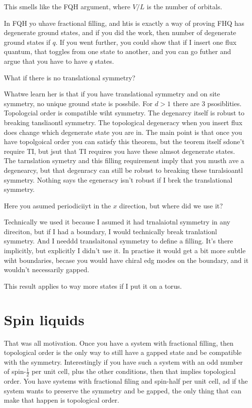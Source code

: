 \begin{question}
    This smells like the FQH argument,
    where $V/L$ is the number of orbitals.
\end{question}
In FQH yo uhave fractional filling,
and htis is exactly a way of proving FHQ has degenerate ground states,
and if you did the work,
then number of degenerate ground states if $q$.
If you went further,
you could show that if I insert one flux quantum,
that toggles from one state to another,
and you can go futher and argue that you have to have $q$ states.

\begin{question}
    What if there is no translational symmetry?
\end{question}
Whatwe learn her is that if you have translational symmetry and on site
symmetry,
no unique ground state is possbile.
For $d>1$ there are 3 psosiblities.
Topologcial order is compatible wiht symmetry.
The degenarcy itself is robust to breaking tansliaontl symmetry.
The topological degeneracy when you insert flux does change which degenerate
state you are in.
The main point is that once you have topolgoical order you can satisfy this
theorem,
but the teorem itself sdone't require TI,
but jsut that TI requires you have these almsot degenerate states.
The tarnslation symetry and this filling requirement imply that you musth ave a
degenearcy,
but that degenracy can still be robust to breaking these tnralsioantl symmetry.
Nothing says the egeneracy isn't robust if I brek the translational symmetry.

\begin{question}
    Here you asumed periodiciiyt in the $x$ direction,
    but where did we use it?
\end{question}
Technically we used it because I asumed it had trnalaiotnl symmetry in any
direciton,
but if I had a boundary,
I would technically break tranlationl symmetry.
And I needdd translaitonal symmetry to define a filling.
It's there implicitly,
but explicitly I didn't use it.
In practise it would get a bit more subtle wiht boundaries,
becase you would have chiral edg modes on the boundary,
and it wouldn't necessarily gapped.

This result applies to way more states if I put it on a torus.

\section{Spin liquids}
That was all motivation.
Once you have a system with fractional filling,
then topological order is the only way to still have a gapped state and be
compatible with the symmetry.
Interestingly if you have such a system with an odd number of spin-$\frac{1}{2}$ 
per unit cell,
plus the other conditions,
then that implies topological order.
You have systems with fractional filing and spin-half per unit cell,
ad if the system wants to preserve the symmetry and be gapped,
the only thing that can make that happen is topological order.

